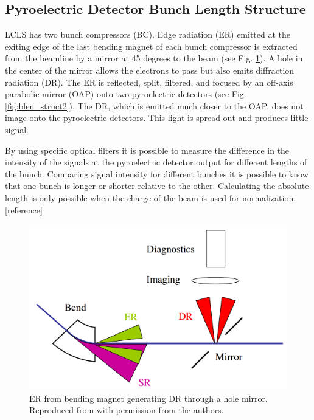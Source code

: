 \documentclass[letter,
        biblatex,   %
        keeplastbox,  %
        ]{jacow}
\begin{document}
\subsection{Pyroelectric Detector Bunch Length Structure}
LCLS has two bunch compressors (BC). Edge radiation (ER) emitted at the exiting edge of the last bending magnet of each bunch compressor is extracted from the beamline by a mirror at 45 degrees to the beam (see Fig. \ref{fig:blen_struct1}). A hole in the center of the mirror allows the electrons to pass but also emits diffraction radiation (DR). The ER is reflected, split, filtered, and focused by an off-axis parabolic mirror (OAP) onto two pyroelectric detectors (see Fig. \ref{fig:blen_struct2}). The DR, which is emitted much closer to the OAP, does not image onto the pyroelectric detectors. This light is spread out and produces little signal. \cite{blen-pac07}

By using specific optical filters it is possible to measure the difference in the intensity of the signals at the pyroelectric detector output for different lengths of the bunch. Comparing signal intensity for different bunches it is possible to know that one bunch is longer or shorter relative to the other. Calculating the absolute length is only possible when the charge of the beam is used for normalization. [reference]

\begin{figure}[!htb]
  \centering
  \includegraphics*[width=\columnwidth]{BunchLengthStruct_1}
  \caption{ER from bending magnet generating DR through a hole mirror. Reproduced from \cite{blen-pac07} with permission from the authors.}
  \label{fig:blen_struct1}
\end{figure}
\end{document}
